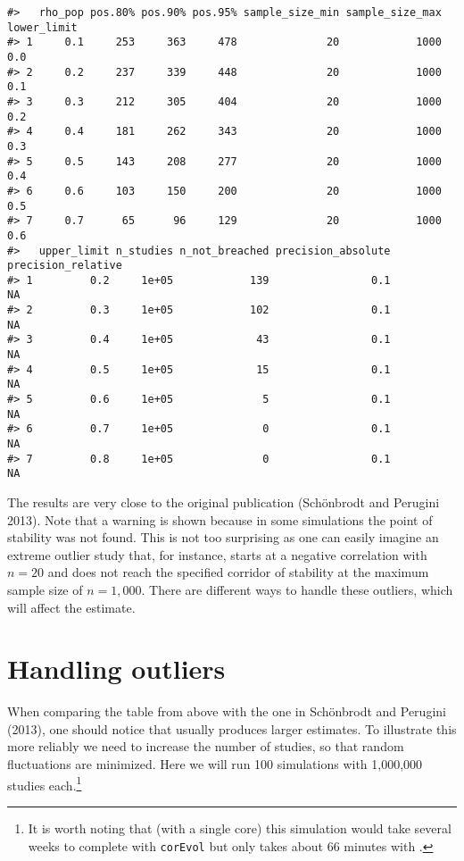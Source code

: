\begin{verbatim}
#>   rho_pop pos.80% pos.90% pos.95% sample_size_min sample_size_max lower_limit
#> 1     0.1     253     363     478              20            1000         0.0
#> 2     0.2     237     339     448              20            1000         0.1
#> 3     0.3     212     305     404              20            1000         0.2
#> 4     0.4     181     262     343              20            1000         0.3
#> 5     0.5     143     208     277              20            1000         0.4
#> 6     0.6     103     150     200              20            1000         0.5
#> 7     0.7      65      96     129              20            1000         0.6
#>   upper_limit n_studies n_not_breached precision_absolute precision_relative
#> 1         0.2     1e+05            139                0.1                 NA
#> 2         0.3     1e+05            102                0.1                 NA
#> 3         0.4     1e+05             43                0.1                 NA
#> 4         0.5     1e+05             15                0.1                 NA
#> 5         0.6     1e+05              5                0.1                 NA
#> 6         0.7     1e+05              0                0.1                 NA
#> 7         0.8     1e+05              0                0.1                 NA
\end{verbatim}

The results are very close to the original publication (Schönbrodt and Perugini 2013). Note that a warning is shown because in some simulations the point of stability was not found. This is not too surprising as one can easily imagine an extreme outlier study that, for instance, starts at a negative correlation with \(n=20\) and does not reach the specified corridor of stability at the maximum sample size of \(n=1,000\). There are different ways to handle these outliers, which will affect the estimate.

\hypertarget{handling-outliers}{%
\section{Handling outliers}\label{handling-outliers}}

When comparing the table from above with the one in Schönbrodt and Perugini (2013), one should notice that  usually produces larger estimates. To illustrate this more reliably we need to increase the number of studies, so that random fluctuations are minimized. Here we will run 100 simulations with 1,000,000 studies each.\footnote{It is worth noting that (with a single core) this simulation would take several weeks to complete with \texttt{corEvol} but only takes about 66 minutes with .}

